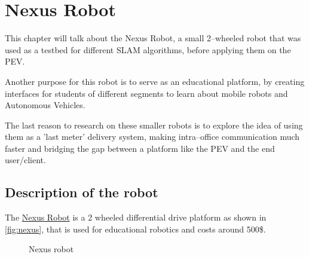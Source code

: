 
\chapter{Nexus Robot}
\label{ch:nexus}

This chapter will talk about the Nexus Robot, a small 2--wheeled robot that was used as a testbed for different SLAM algorithms, before applying them on the PEV.

Another purpose for this robot is to serve as an educational platform, by creating interfaces for students of different segments to learn about mobile robots and Autonomous Vehicles.

The last reason to research on these smaller robots is to explore the idea of using them as a 'last meter' delivery system, making intra--office communication much faster and bridging the gap between a platform like the PEV and the end user/client.

\section{Description of the robot}

The \href{https://www.nexusrobot.com/}{Nexus Robot} is a 2 wheeled differential drive platform as shown in \autoref{fig:nexus}, that is used for educational robotics and costs around 500\$.
\begin{figure}[htb]
  \centering
   \quad
  \caption{Nexus robot}
  \label{fig:nexus}
\end{figure} 

